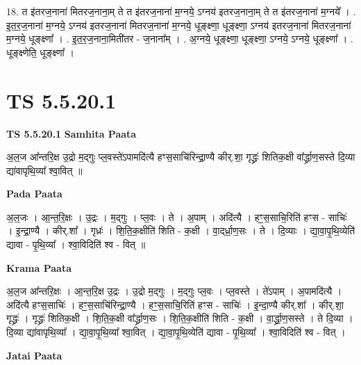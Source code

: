 \documentclass[17pt]{extarticle}
\begin{document}
18. त इ॑तरज॒नाना॑ मितरज॒नाना॒म् ते त इ॑तरज॒नाना॑ म॒ग्नये॒ ऽग्नय॑ इतरज॒नाना॒म् ते त इ॑तरज॒नाना॑ म॒ग्नये᳚ । . इ॒त॒र॒ज॒नाना॑ म॒ग्नये॒ ऽग्नय॑ इतरज॒नाना॑ मितरज॒नाना॑ म॒ग्नये॒ धूङ्क्ष्णा॒ धूङ्क्ष्णा॒ ऽग्नय॑ इतरज॒नाना॑ मितरज॒नाना॑ म॒ग्नये॒ धूङ्क्ष्णा᳚ । . इ॒त॒र॒ज॒नाना॒मिती॑तर - ज॒नाना᳚म् । . अ॒ग्नये॒ धूङ्क्ष्णा॒ धूङ्क्ष्णा॒ ऽग्नये॒ ऽग्नये॒ धूङ्क्ष्णा᳚ । . धूङ्‍क्ष्णेति॒ धूङ्‍क्ष्णा᳚ । \newline
\pagebreak
{}

\section{ TS 5.5.20.1 }

\textbf{TS 5.5.20.1 } \newline
\textbf{Samhita Paata} \newline

अ॒ल॒ज आ᳚न्तरि॒क्ष उ॒द्रो म॒द्गुः प्ल॒वस्ते॑ऽपामदि॑त्यै हꣳस॒साचि॑रिन्द्रा॒ण्यै कीर्.शा॒ गृद्ध्रः॑ शितिक॒क्षी वा᳚र्द्ध्राण॒सस्ते दि॒व्या द्या॑वापृथि॒व्या᳚ श्वा॒वित् ॥ \newline

\textbf{Pada Paata} \newline

अ॒ल॒जः । आ॒न्त॒रि॒क्षः । उ॒द्रः । म॒द्गुः । प्ल॒वः । ते । अ॒पाम् । अदि॑त्यै । हꣳ॒॒स॒साचि॒रिति॑ हꣳस - साचिः॑ । इ॒न्द्रा॒ण्यै । कीर्.शा᳚ । गृध्रः॑ । शि॒ति॒क॒क्षीति॑ शिति - क॒क्षी । वा॒द्‌र्ध्रा॒ण॒सः । ते । दि॒व्याः । द्या॒वा॒पृ॒थि॒व्येति॑ द्यावा - पृ॒थि॒व्या᳚ । श्वा॒विदिति॑ श्व - वित् ॥  \newline


\textbf{Krama Paata} \newline

अ॒ल॒ज आ᳚न्तरि॒क्षः । आ॒न्त॒रि॒क्ष उ॒द्रः । उ॒द्रो म॒द्गुः । म॒द्गुः प्ल॒वः । प्ल॒वस्ते । ते॑ऽपाम् । अ॒पामदि॑त्यै । अदि॑त्यै हꣳस॒साचिः॑ । हꣳ॒॒स॒साचि॑रिन्द्रा॒ण्यै । हꣳ॒॒स॒साचि॒रिति॑ हꣳस - साचिः॑ । इ॒न्दा॒ण्यै कीर्.शा᳚ । कीर्.शा॒ गृद्ध्रः॑ । गृद्ध्रः॑ शितिक॒क्षी । शि॒ति॒क॒क्षी वा᳚र्द्ध्राण॒सः । शि॒ति॒क॒क्षीति॑ शिति - क॒क्षी । वा॒र्द्ध्रा॒ण॒सस्ते । ते दि॒व्या । दि॒व्या द्या॑वापृथि॒व्या᳚ । द्या॒वा॒पृ॒थि॒व्या᳚ श्वा॒वित् । द्या॒वा॒पृ॒थि॒व्येति॑ द्यावा - पृ॒थि॒व्या᳚ । श्वा॒विदिति॑ श्व - वित् । \newline

\textbf{Jatai Paata} \newline
\end{document}
